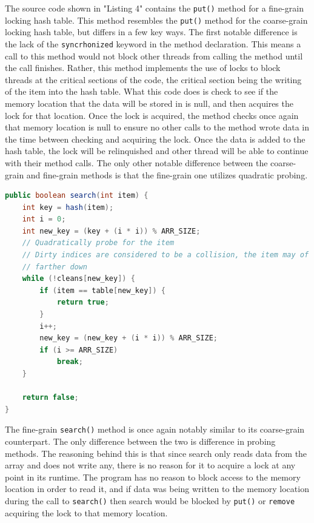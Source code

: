 \documentclass[conference]{IEEEtran}
\begin{document}
The source code shown in "Listing 4" contains the \verb|put()| method for a fine-grain locking hash table. This method resembles the
\verb|put()| method for the coarse-grain locking hash table, but differs in a few key ways. The first notable difference is the lack of 
the \verb|syncrhonized| keyword in the method declaration. This means a call to this method would not block other threads from calling the
method until the call finishes. Rather, this method implements the use of locks to block threads at the critical sections of the code, the
critical section being the writing of the item into the hash table. What this code does is check to see if the memory location that the 
data will be stored in is null, and then acquires the lock for that location. Once the lock is acquired, the method checks once again that
memory location is null to ensure no other calls to the method wrote data in the time between checking and acquiring the lock. Once the data
is added to the hash table, the lock will be relinquished and other thread will be able to continue with their method calls. The only other
notable difference between the coarse-grain and fine-grain methods is that the fine-grain one utilizes quadratic probing.

\begin{lstlisting}[language={Java},caption=Source code for the fine-grain search() method.,captionpos=b,breaklines=true,frame=single]
public boolean search(int item) {
    int key = hash(item);
    int i = 0;
    int new_key = (key + (i * i)) % ARR_SIZE;
    // Quadratically probe for the item
    // Dirty indices are considered to be a collision, the item may of been probed
    // farther down
    while (!cleans[new_key]) {
        if (item == table[new_key]) {
            return true;
        }
        i++;
        new_key = (new_key + (i * i)) % ARR_SIZE;
        if (i >= ARR_SIZE)
            break;
    }

    return false;
}
\end{lstlisting}

The fine-grain \verb|search()| method is once again notably similar to its coarse-grain counterpart. The only difference between the two
is difference in probing methods. The reasoning behind this is that since search only reads data from the array and does not write any,
there is no reason for it to acquire a lock at any point in its runtime. The program has no reason to block access to the memory location
in order to read it, and if data was being written to the memory location during the call to \verb|search()| then search would be blocked
by \verb|put()| or \verb|remove| acquiring the lock to that memory location.
\end{document}
